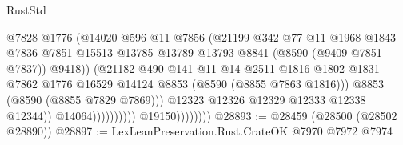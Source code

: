 \begin{lexlean}{RustStd}
\begin{coremodule}
                                              @7828
                                              @1776
                                              (@14020
                                                @596
                                                @11
                                                @7856
                                                (@21199
                                                  @342
                                                  @77
                                                  @11
                                                  @1968
                                                  @1843
                                                  @7836
                                                  @7851
                                                  @15513
                                                  @13785
                                                  @13789
                                                  @13793
                                                  @8841
                                                  (@8590 (@9409 @7851 @7837))
                                                  @9418))
                                              (@21182
                                                @490
                                                @141
                                                @11
                                                @14
                                                @2511
                                                @1816
                                                @1802
                                                @1831
                                                @7862
                                                @1776
                                                @16529
                                                @14124
                                                @8853
                                                (@8590 (@8855 @7863 @1816)))
                                              @8853
                                              (@8590 (@8855 @7829 @7869)))
                                            @12323
                                            @12326
                                            @12329
                                            @12333
                                            @12338
                                            @12344))
                                        @14064))))))))))
                    @19150))))))))
@28893 := @28459 (@28500 (@28502 @28890))
@28897 := LexLeanPreservation.Rust.CrateOK @7970 @7972 @7974

\end{coremodule}
\end{lexlean}
